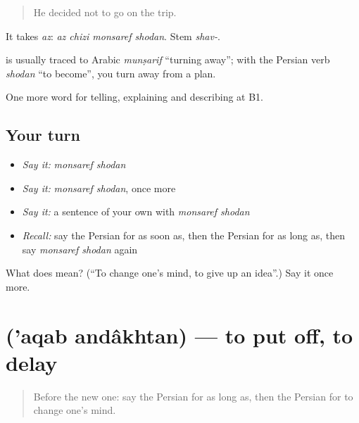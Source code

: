 \begin{quote}
He decided not to go on the trip.
\end{quote}

It takes \emph{az}: \emph{az chizi monsaref shodan}. Stem \emph{shav-}.

\begin{cousinweb}
\textbf{} is usually traced to Arabic \emph{munṣarif} \textquotedblleft{}turning away\textquotedblright{}; with the Persian verb \emph{shodan} \textquotedblleft{}to become\textquotedblright{}, you turn away from a plan.
\end{cousinweb}

\begin{grammarlens}[title={What you've built}]
One more word for telling, explaining and describing at B1.
\end{grammarlens}

\subsection*{Your turn}
\begin{itemize}
\raggedright
  \item \emph{Say it:} \emph{monsaref shodan}
  \item \emph{Say it:} \emph{monsaref shodan}, once more
  \item \emph{Say it:} a sentence of your own with \emph{monsaref shodan}
  \item \emph{Recall:} say the Persian for as soon as, then the Persian for as long as, then say \emph{monsaref shodan} again
\end{itemize}

\begin{tcolorbox}[breakable,colback=teal!4,colframe=teal!35!black,title={Before you move on}]
What does   mean? (\textquotedblleft{}To change one's mind, to give up an idea\textquotedblright{}.) Say it once more.
\end{tcolorbox}
\section[\texorpdfstring{\fa{عقب} \fa{انداختن} ('aqab andâkhtan)}{عقب انداختن ('aqab andâkhtan)}]{  ('aqab andâkhtan) — to put off, to delay}

\label{lesson:FA-C396-aqab-andakhtan}



\begin{quote}
Before the new one: say the Persian for as long as, then the Persian for to change one's mind.
\end{quote}


